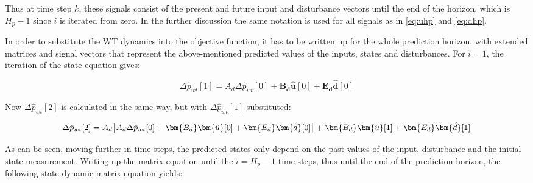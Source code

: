 Thus at time step $k$, these signals consist of the present and future input and disturbance vectors until the end of the horizon, which is $H_p - 1$ since $i$ is iterated from zero. In the further discussion the same notation is used for all signals as in \eqref{eq:uhp} and \eqref{eq:dhp}.

In order to substitute the WT dynamics into the objective function, it has to be written up for the whole prediction horizon, with extended matrices and signal vectors that represent the above-mentioned predicted values of the inputs, states and disturbances.
For $i = 1$, the iteration of the state equation gives:


\begin{equation}
	\Delta \hat p_{wt}[1] = A_d\Delta \hat p_{wt}[0] + \bm{B_d} \bm{\hat{u}}[0] + \bm{E_d} \bm{\hat{d}}[0]
\end{equation}

Now $\Delta \hat p_{wt}[2]$ is calculated in the same way, but with $\Delta \hat{p}_{wt}[1]$ substituted: 

\begin{equation}
	\Delta \hat p_{wt}[2] = A_d\big[A_d\Delta \hat p_{wt}[0] + \bm{B_d}  \bm{\hat{u}}[0] + \bm{E_d}  \bm{\hat{d}}[0]\big] + \bm{B_d} \bm{\hat{u}}[1] + \bm{E_d} \bm{\hat{d}}[1]\\ 
\end{equation}

As can be seen, moving further in time steps, the predicted states only depend on the past values of the input, disturbance and the initial state measurement. Writing up the matrix equation until the $i = H_p - 1$ time steps, thus until the end of the prediction horizon, the following state dynamic matrix equation yields:

